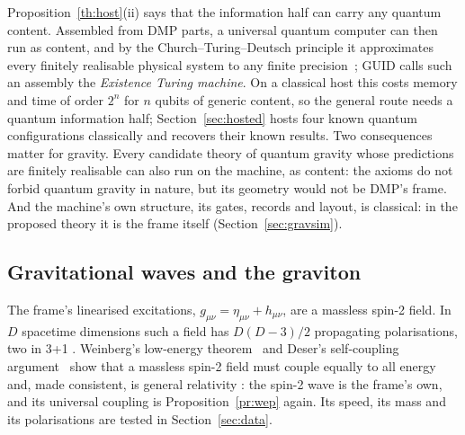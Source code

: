 Proposition~\ref{th:host}(ii) says that the information half can carry any quantum content. Assembled from DMP parts, a universal
quantum computer can then run as content, and by the Church--Turing--Deutsch principle it approximates every finitely realisable
physical system to any finite precision~\cite{deutsch}; GUID calls such an assembly the \emph{Existence Turing machine}. On a classical
host this costs memory and time of order $2^n$ for $n$ qubits of generic content, so the general route needs a quantum information half;
Section~\ref{sec:hosted} hosts four known quantum configurations classically and recovers their known results. Two consequences matter
for gravity. Every candidate theory of quantum gravity whose predictions are finitely realisable can also run on the machine, as content:
the axioms do not forbid quantum gravity in nature, but its geometry would not be DMP's frame. And the machine's own structure, its gates,
records and layout, is classical: in the proposed theory it is the frame itself (Section~\ref{sec:gravsim}).

\subsection{Gravitational waves and the graviton}

The frame's linearised excitations, $g_{\mu\nu}=\eta_{\mu\nu}+h_{\mu\nu}$, are a massless spin-2 field. In $D$ spacetime dimensions such a
field has $D(D-3)/2$ propagating polarisations, two in 3+1 . Weinberg's low-energy theorem~\cite{weinberg64} and Deser's
self-coupling argument~\cite{deser70} show that a massless spin-2 field must couple equally to all energy and, made consistent, is general
relativity \tagP: the spin-2 wave is the frame's own, and its universal coupling is Proposition~\ref{pr:wep} again. Its speed, its
mass and its polarisations are tested in Section~\ref{sec:data}.

